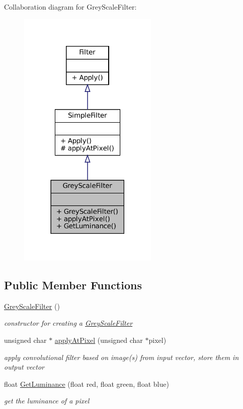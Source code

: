 Collaboration diagram for Grey\+Scale\+Filter\+:
\nopagebreak
\begin{figure}[H]
\begin{center}
\leavevmode
\includegraphics[width=189pt]{classGreyScaleFilter__coll__graph}
\end{center}
\end{figure}
\subsection*{Public Member Functions}
\begin{DoxyCompactItemize}
\item 
\hyperlink{classGreyScaleFilter_a39c97682b954a5c00135eb4c13bddd47}{Grey\+Scale\+Filter} ()
\begin{DoxyCompactList}\small\item\em constructor for creating a \hyperlink{classGreyScaleFilter}{Grey\+Scale\+Filter} \end{DoxyCompactList}\item 
unsigned char $\ast$ \hyperlink{classGreyScaleFilter_afac3eb54599341d326d9df20de67f851}{apply\+At\+Pixel} (unsigned char $\ast$pixel)
\begin{DoxyCompactList}\small\item\em apply convolutional filter based on image(s) from input vector, store them in output vector \end{DoxyCompactList}\item 
float \hyperlink{classGreyScaleFilter_a89a03b17fa1ee8c556eeb173b11bf4e4}{Get\+Luminance} (float red, float green, float blue)
\begin{DoxyCompactList}\small\item\em get the luminance of a pixel \end{DoxyCompactList}\end{DoxyCompactItemize}
